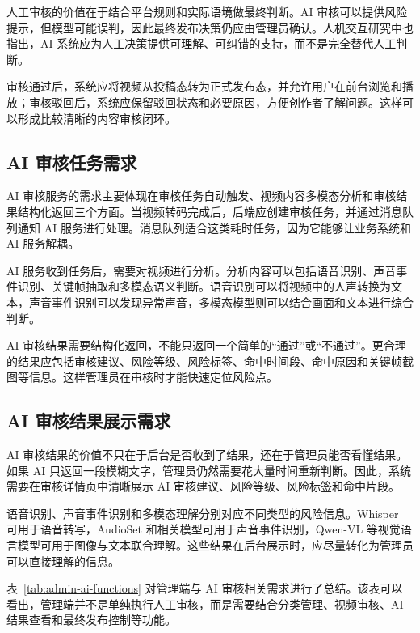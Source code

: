人工审核的价值在于结合平台规则和实际语境做最终判断。AI 审核可以提供风险提示，但模型可能误判，因此最终发布决策仍应由管理员确认。人机交互研究中也指出，AI 系统应为人工决策提供可理解、可纠错的支持，而不是完全替代人工判断\cite{amershi2019guidelines}。

审核通过后，系统应将视频从投稿态转为正式发布态，并允许用户在前台浏览和播放；审核驳回后，系统应保留驳回状态和必要原因，方便创作者了解问题。这样可以形成比较清晰的内容审核闭环。

\subsection{AI 审核任务需求}
\label{subsec:ai-task-requirements}

AI 审核服务的需求主要体现在审核任务自动触发、视频内容多模态分析和审核结果结构化返回三个方面。当视频转码完成后，后端应创建审核任务，并通过消息队列通知 AI 服务进行处理。消息队列适合这类耗时任务，因为它能够让业务系统和 AI 服务解耦\cite{rabbitmqdocs}。

AI 服务收到任务后，需要对视频进行分析。分析内容可以包括语音识别、声音事件识别、关键帧抽取和多模态语义判断。语音识别可以将视频中的人声转换为文本，声音事件识别可以发现异常声音，多模态模型则可以结合画面和文本进行综合判断。

AI 审核结果需要结构化返回，不能只返回一个简单的“通过”或“不通过”。更合理的结果应包括审核建议、风险等级、风险标签、命中时间段、命中原因和关键帧截图等信息。这样管理员在审核时才能快速定位风险点。

\subsection{AI 审核结果展示需求}
\label{subsec:ai-result-display-requirements}

AI 审核结果的价值不只在于后台是否收到了结果，还在于管理员能否看懂结果。如果 AI 只返回一段模糊文字，管理员仍然需要花大量时间重新判断。因此，系统需要在审核详情页中清晰展示 AI 审核建议、风险等级、风险标签和命中片段。

语音识别、声音事件识别和多模态理解分别对应不同类型的风险信息。Whisper 可用于语音转写，AudioSet 和相关模型可用于声音事件识别，Qwen-VL 等视觉语言模型可用于图像与文本联合理解\cite{radford2023whisper}。这些结果在后台展示时，应尽量转化为管理员可以直接理解的信息。

表~\ref{tab:admin-ai-functions} 对管理端与 AI 审核相关需求进行了总结。该表可以看出，管理端并不是单纯执行人工审核，而是需要结合分类管理、视频审核、AI 结果查看和最终发布控制等功能。

